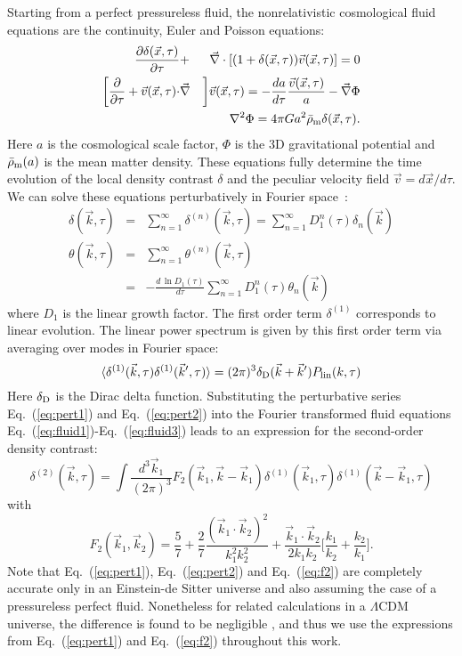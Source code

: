\documentclass[prd,amsmath,amssymb,floatfix,superscriptaddress,nofootinbib,twocolumn]{revtex4-1}
\def\be{\begin{equation}}
\def\ee{\end{equation}}
\def\bea{\begin{eqnarray}}
\def\eea{\end{eqnarray}}
\newcommand{\vs}{\nonumber\\}
\newcommand{\vk}{\vec{k}}
\newcommand{\ec}[1]{Eq.~(\ref{eq:#1})}
\newcommand{\eql}[1]{\label{eq:#1}}
\newcommand{\peikai}[1]{{\color{blue} #1}}
\begin{document}
\label{sec1}
Starting from a perfect pressureless fluid, the nonrelativistic cosmological fluid equations are the continuity, Euler and Poisson equations:
\bea
\frac{\partial \delta(\vec{x},\tau)}{\partial \tau} &+&\vec{\nabla}\cdot [(1+\delta(\vec{x},\tau))\vec{v}(\vec{x},\tau)] =0\eql{fluid1} \\
\bigg[\frac{\partial}{\partial \tau} +\vec{v}(\vec{x},\tau)\cdot&\vec{\nabla}& \bigg]\vec{v}(\vec{x},\tau)=-\frac{da}{d\tau}\frac{\vec{v}(\vec{x},\tau)}{a}-\vec{\nabla}\Phi \eql{eulereq}\\
&&\nabla^2 \Phi = 4\pi G a^2 \bar{\rho}_{\rm m} \delta(\vec{x},\tau) .\eql{fluid3}
\eea
\peikai{Here $a$ is the cosmological scale factor, $\Phi$ is the 3D gravitational potential and $\bar{\rho}_{\rm m}(a)$ is the mean matter density.} These equations fully determine the time evolution of the local density contrast $\delta$ and the peculiar velocity field $\vec{v}=d\vec{x}/d\tau$.
We can solve these equations perturbatively in Fourier space~\cite{Bernardeau:2002rev}:
\bea
{\delta}(\vk,\tau) &=&\sum_{n=1}^{\infty} {\delta}^{(n)}(\vk,\tau)=\sum_{n=1}^{\infty}D_1^{n}(\tau)\delta_{n}(\vk)  \eql{pert1}\\
{\theta}(\vk,\tau)&=&\sum_{n=1}^{\infty}{\theta}^{(n)}(\vk,\tau) \vs
&=&-\frac{d\,\ln D_1(\tau)}{d\tau}\sum_{n=1}^{\infty}D_1^{n}(\tau)\theta_{n}(\vk) \eql{pert2}
\eea
where $D_1$ is the linear growth factor. 
The first order term ${\delta}^{(1)}$ corresponds to linear evolution. The linear power spectrum is given by this first order term via \peikai{averaging over modes in Fourier space}:
\be 
\langle {\delta^{(1)}}(\vk,\tau){\delta^{(1)}}(\vk',\tau) \rangle =(2\pi)^3 \delta_{\rm D}(\vk+\vk')P_{\rm lin}(k,\tau) \eql{lin}
\ee 
\peikai{Here $\delta_{\rm D}$ is the Dirac delta function.} Substituting the perturbative series \ec{pert1} and \ec{pert2} into the Fourier transformed fluid equations \ec{fluid1}-\ec{fluid3} leads to an expression for the second-order density contrast:
\be
{\delta}^{(2)}(\vk,\tau)=\int \frac{d^{3}\vk_{1}}{(2\pi)^3} F_2(\vk_1,\vk-\vk_1){\delta}^{(1)}(\vk_1,\tau) {\delta}^{(1)}(\vk-\vk_1,\tau) \eql{sorder} 
\ee
with 
\be
F_{2}(\vk_1,\vk_2)=\frac{5}{7}+\frac{2}{7}\frac{(\vk_1\cdot \vk_2)^2}{k_1^2 k_2^2}+\frac{\vk_1\cdot \vk_2}{2k_1k_2}\bigg[\frac{k_1}{k_2}+\frac{k_2}{k_1}\bigg].\eql{f2}
\ee
Note that \ec{pert1}, \ec{pert2} and \ec{f2} are completely accurate only in an Einstein-de Sitter universe \peikai{and also assuming the case of a pressureless perfect fluid}. Nonetheless for related calculations in a $\Lambda$CDM universe, the difference is found to be negligible \cite{Takahashi:2008to}, and thus we use the expressions from \ec{pert1} and \ec{f2} throughout this work.
\end{document}
